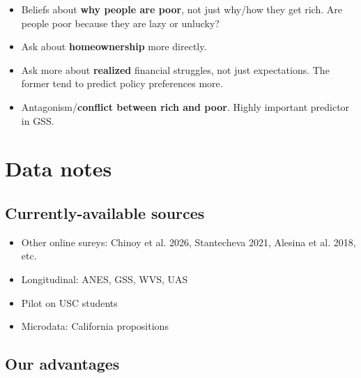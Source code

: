 \documentclass{article}
\begin{document}
\begin{itemize}
    \item Beliefs about  \textbf{why people are poor}, not just why/how they get rich. Are people poor because they are lazy or unlucky?
    \item Ask about \textbf{homeownership} more directly. 
    \item Ask more about \textbf{realized} financial struggles, not just expectations. The former tend to predict policy preferences more.
    \item Antagonism/\textbf{conflict between rich and poor}. Highly important predictor in GSS. 
\end{itemize}

\section*{Data notes}

\subsection*{Currently-available sources}

\begin{itemize}
    \item Other online sureys: Chinoy et al. 2026, Stantecheva 2021, Alesina et al. 2018, etc.
    \item Longitudinal: ANES, GSS, WVS, UAS
    \item Pilot on USC students
    \item Microdata: California propositions
\end{itemize}

\subsection*{Our advantages}
\end{document}
